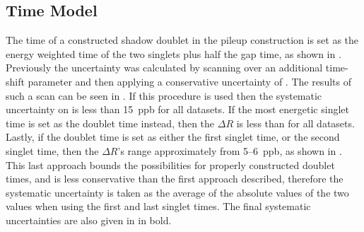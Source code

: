 \clearpage
\subsection{Time Model}

The time of a constructed shadow doublet in the pileup construction is set as the energy weighted time of the two singlets plus half the gap time, as shown in . Previously the uncertainty was calculated by scanning over an additional time-shift parameter and then applying a conservative uncertainty of  \cite{phdthesis:2020Kinnaird}. The results of such a scan can be seen in . If this procedure is used then the systematic uncertainty on \R is less than 15~ppb for all datasets. If the most energetic singlet time is set as the doublet time instead, then the $\Delta R$ is less than  for all datasets. Lastly, if the doublet time is set as either the first singlet time, or the second singlet time, then the $\Delta R$'s range approximately from 5--6~ppb, as shown in . This last approach bounds the possibilities for properly constructed doublet times, and is less conservative than the first approach described, therefore the systematic uncertainty is taken as the average of the absolute values of the two \DR values when using the first and last singlet times. The final systematic uncertainties are also given in  in bold.




